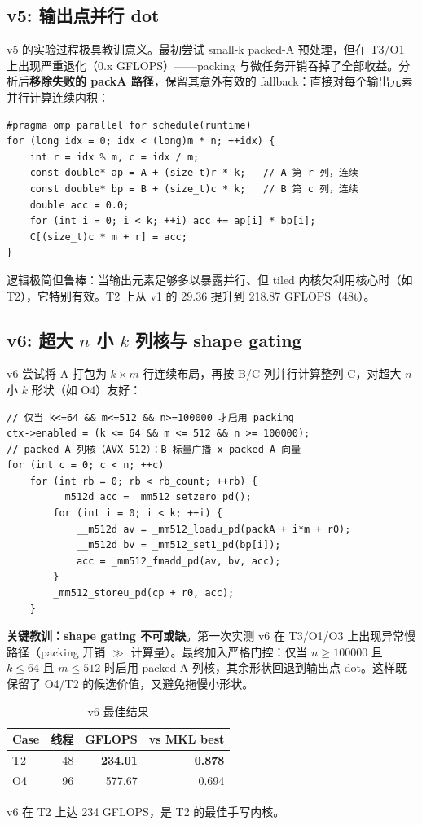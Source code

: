 \documentclass[11pt,a4paper,fontset=fandol]{ctexart}
\begin{document}
\subsection{v5: 输出点并行 dot}
v5 的实验过程极具教训意义。最初尝试 small-k packed-A 预处理，但在 T3/O1 上出现严重退化（0.x GFLOPS）——packing 与微任务开销吞掉了全部收益。分析后\textbf{移除失败的 packA 路径}，保留其意外有效的 fallback：直接对每个输出元素并行计算连续内积：
\begin{lstlisting}
#pragma omp parallel for schedule(runtime)
for (long idx = 0; idx < (long)m * n; ++idx) {
    int r = idx % m, c = idx / m;
    const double* ap = A + (size_t)r * k;   // A 第 r 列，连续
    const double* bp = B + (size_t)c * k;   // B 第 c 列，连续
    double acc = 0.0;
    for (int i = 0; i < k; ++i) acc += ap[i] * bp[i];
    C[(size_t)c * m + r] = acc;
}
\end{lstlisting}
逻辑极简但鲁棒：当输出元素足够多以暴露并行、但 tiled 内核欠利用核心时（如 T2），它特别有效。T2 上从 v1 的 29.36 提升到 218.87 GFLOPS（48t）。

\subsection{v6: 超大 $n$ 小 $k$ 列核与 shape gating}
v6 尝试将 A 打包为 $k\times m$ 行连续布局，再按 B/C 列并行计算整列 C，对超大 $n$ 小 $k$ 形状（如 O4）友好：
\begin{lstlisting}
// 仅当 k<=64 && m<=512 && n>=100000 才启用 packing
ctx->enabled = (k <= 64 && m <= 512 && n >= 100000);
// packed-A 列核（AVX-512）：B 标量广播 x packed-A 向量
for (int c = 0; c < n; ++c)
    for (int rb = 0; rb < rb_count; ++rb) {
        __m512d acc = _mm512_setzero_pd();
        for (int i = 0; i < k; ++i) {
            __m512d av = _mm512_loadu_pd(packA + i*m + r0);
            __m512d bv = _mm512_set1_pd(bp[i]);
            acc = _mm512_fmadd_pd(av, bv, acc);
        }
        _mm512_storeu_pd(cp + r0, acc);
    }
\end{lstlisting}
\textbf{关键教训：shape gating 不可或缺}。第一次实测 v6 在 T3/O1/O3 上出现异常慢路径（packing 开销 $\gg$ 计算量）。最终加入严格门控：仅当 $n\geq100000$ 且 $k\leq64$ 且 $m\leq512$ 时启用 packed-A 列核，其余形状回退到输出点 dot。这样既保留了 O4/T2 的候选价值，又避免拖慢小形状。

\begin{table}[H]
\centering
\caption{v6 最佳结果}
\small
\begin{tabular}{lrrr}
\toprule
Case & 线程 & GFLOPS & vs MKL best \\
\midrule
T2 & 48 & \textbf{234.01} & \textbf{0.878} \\
O4 & 96 & 577.67 & 0.694 \\
\bottomrule
\end{tabular}
\end{table}
v6 在 T2 上达 234 GFLOPS，是 T2 的最佳手写内核。
\end{document}
